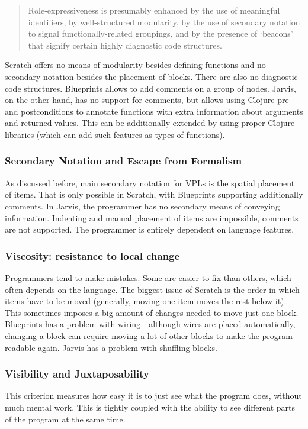 \documentclass[11pt]{scrartcl}
\begin{document}
\blockquote[{\cite{Green96UsabilityAnalysis}}]{Role-expressiveness is presumably
  enhanced by the use of meaningful identifiers, by well-structured modularity,
  by the use of secondary notation to signal functionally-related groupings, and
  by the presence of ‘beacons’ that signify certain highly diagnostic code
  structures.}

Scratch offers no means of modularity besides defining functions and no
secondary notation besides the placement of blocks.
There are also no diagnostic code structures.
Blueprints allows to add comments on a group of nodes.
Jarvis, on the other hand, has no support for comments, but allows using
Clojure pre- and postconditions to annotate functions with extra information
about arguments and returned values.
This can be additionally extended by using proper Clojure libraries (which can
add such features as types of functions).

\subsubsection{Secondary Notation and Escape from Formalism}
As discussed before, main secondary notation for VPLs is the spatial placement
of items.
That is only possible in Scratch, with Blueprints supporting additionally
comments.
In Jarvis, the programmer has no secondary means of conveying information.
Indenting and manual placement of items are impossible, comments are not
supported.
The programmer is entirely dependent on language features.
\subsubsection{Viscosity: resistance to local change}
Programmers tend to make mistakes.
Some are easier to fix than others, which often depends on the language.
The biggest issue of Scratch is the order in which items have to be moved
(generally, moving one item moves the rest below it).
This sometimes imposes a big amount of changes needed to move just one block.
Blueprints has a problem with wiring - although wires are placed automatically,
changing a block can require moving a lot of other blocks to make the program
readable again.
Jarvis has a problem with shuffling blocks.

\subsubsection{Visibility and Juxtaposability}
This criterion measures how easy it is to just see what the program does,
without much mental work.
This is tightly coupled with the ability to see different parts of the program
at the same time.
\end{document}
